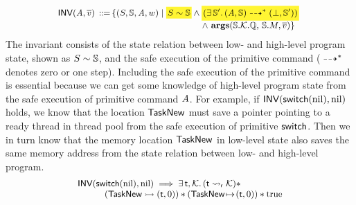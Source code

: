\[
    \small
    \begin{array}{l}
        \!\!
        \INV{(\primcom, \args{\val})} \, \define \, 
        \{
            (\state, \hpstate, \primcom, \word) \sepline
            \colorbox{yellow!80}{\!$\stateRel{\state}{\hpstate}$\!}
            \land 
            \colorbox{yellow!80}
            {\!\!\!
                $(\exists \, \hpstate'. \,
                \primMultiTrans
                    {(\primcom, \hpstate)}
                    {*}{(\primdone, \hpstate')})$ 
            \!\!\!} \\
            \hspace*{15.8em} 
            \land \
            \arguments(\hpstate.\hthrdlocalst.\hRstate, \,  
            \hpstate.\Mem, \args{\val})
        \}
    \end{array}
\]
The invariant consists of the state relation between low- and 
high-level program state,  
shown as ${S} \sim {\mathbb{S}}$, 
and the safe execution of the primitive command
(${} \dashrightarrow^{*} {}$ denotes zero or one step). 
Including the safe execution of 
the primitive command is essential 
because we can get some knowledge of high-level program 
state from the safe execution of 
primitive command $\textit{A}$. 
For example, if $\textsf{INV}{(\mathsf{switch}(\text{nil}), \text{nil})}$
holds, we know that the location $\mathsf{TaskNew}$ 
must save a pointer pointing to a ready thread
in thread pool from the safe execution of primitive $\mathsf{switch}$. 
Then we in turn know that the memory location $\mathsf{TaskNew}$ 
in low-level state also saves the same memory address  
from the state relation 
between low- and high-level program. 
\[
    \small
    \begin{array}{l}
        \textsf{INV}{(\mathsf{switch}(\text{nil}), \text{nil})} 
        \implies
        \exists \, \textsf{t}, \mathcal{K}. \, 
        ({\textsf{t}} \leadsto_{\textsf{r}} {\mathcal{K}}) * \\
        \qquad\quad
        ({\mathsf{TaskNew}} \rightarrowtail {(\textsf{t}, 0)}) 
        * 
        ({\mathsf{TaskNew}} \!\mapsto\! {(\textsf{t}, 0)})
        * \text{true}
    \end{array}
\]
